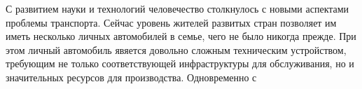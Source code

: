 С развитием науки и технологий человечество столкнулось с новыми аспектами проблемы транспорта. Сейчас уровень жителей развитых стран позволяет им иметь несколько личных автомобилей в семье, чего не было никогда прежде. При этом личный автомобиль явяется довольно сложным техническим устройством, требующим не только соответствующей инфраструктуры для обслуживания, но и значительных ресурсов для производства. Одновременно с 